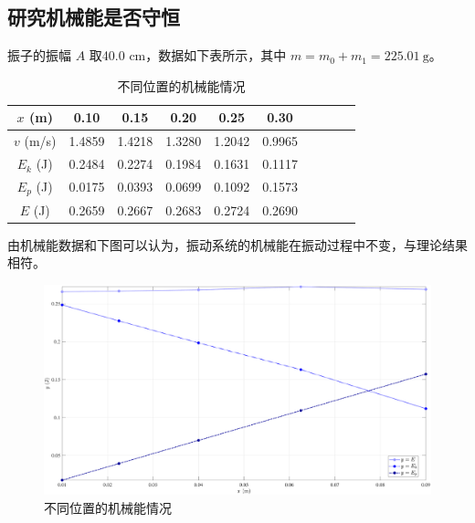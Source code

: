 \documentclass[UTF8]{article}
\theoremstyle{MyLineTheoremStyle} %
\theoremstyle{MyBlockTheoremStyle} %
\theoremstyle{MySubsubsectionStyle} %
\begin{document}
\subsection{研究机械能是否守恒}
    振子的振幅 $A$ 取40.0 cm，数据如下表所示，其中 $m = m_0 + m_1 = 225.01 \ \mathrm{g}$。
\begin{table}[H]\centering
    \caption{不同位置的机械能情况}
    \label{不同位置的机械能情况}
\begin{tabular}{cccccccccc}\toprule
    $x$ (m) & 0.10 & 0.15 & 0.20 & 0.25 & 0.30  \\
    \midrule
    $v$ (m/s) &1.4859	&1.4218	&1.3280	&1.2042	&0.9965 \\
    $E_k$ (J)&0.2484	&0.2274	&0.1984	&0.1631	&0.1117 \\
    $E_p$ (J)&0.0175	&0.0393	&0.0699	&0.1092	&0.1573 \\
    $E$ (J)&0.2659	&0.2667	&0.2683	&0.2724	&0.2690 \\
    \bottomrule
\end{tabular}
\end{table}
    由机械能数据和下图可以认为，振动系统的机械能在振动过程中不变，与理论结果相符。
\begin{figure}[H]\centering
    \includegraphics[width=0.9\columnwidth]{assets/5.pdf}
    \caption{不同位置的机械能情况}
\end{figure}
\end{document}
